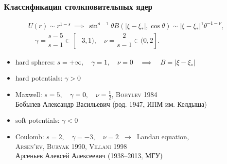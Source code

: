 \documentclass[mathserif]{beamer} %
\newcommand{\Cite}[2][]{\alert{\textsc{#2 #1}}}
\begin{document}
\begin{frame}
    \frametitle{Классификация столкновительных ядер}
    \begin{gather*}
        U(r)\sim r^{1-s} \:\implies\: \sin^{d-1}\theta B(|\xi-\xi_*|,\cos\theta) \sim |\xi-\xi_*|^\gamma \theta^{-1-\nu}, \\
        \quad \gamma = \dfrac{s-5}{s-1}\in[-3,1), \quad \nu = \dfrac2{s-1}\in(0,2].
    \end{gather*}
    \begin{itemize}
        \item hard spheres: \(s=+\infty,\quad\gamma=1,\quad\nu=0 \quad\implies\quad B=|\xi-\xi_*|\)
        \item hard potentials: \(\gamma>0\)
        \item Maxwell: \(s=5,\quad\gamma=0,\quad\nu=\frac12\), \quad \Cite[1984]{Bobylev}\\
            {\footnotesize Бобылев Александр Васильевич (род. 1947, ИПМ им. Келдыша)}
        \item soft potentials: \(\gamma<0\)
        \item Coulomb: \(s=2,\quad\gamma=-3,\quad\nu=2\) \(\:\longrightarrow\:\) Landau equation,\\
            \Cite[1990]{Arsen'ev, Buryak}, \Cite[1998]{Villani} \\
            {\footnotesize Арсеньев Алексей Алексеевич (1938--2013, МГУ)}
    \end{itemize}
\end{frame}
\end{document}

